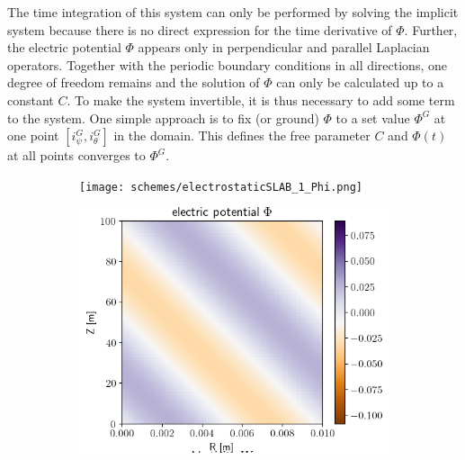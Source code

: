 The time integration of this system can only be performed by solving the implicit system because there is no direct expression for the time derivative of $\Phi$. Further, the electric potential $\Phi$ appears only in perpendicular and parallel Laplacian operators. Together with the periodic boundary conditions in all directions, one degree of freedom remains and the solution of $\Phi$ can only be calculated up to a constant $C$. To make the system invertible, it is thus necessary to add some term to the system. One simple approach is to fix (or ground) $\Phi$ to a set value $\Phi^G$ at one point $[i_\psi^G, i_\theta^G]$ in the domain. This defines the free parameter $C$ and $\Phi(t)$ at all points converges to $\Phi^G$. 

\begin{figure}[H]
	\centering
	\begin{subfigure}[b]{0.34\textwidth}
		\centering
		\texttt{[image: schemes/electrostaticSLAB\_1\_Phi.png]}
		\label{fig:electrostaticSLAB_initialProfile_PHI}
	\end{subfigure}
	\begin{subfigure}[b]{0.34\textwidth}
		\centering
		\includegraphics[width=1.\textwidth]{schemes/electrostaticSLAB_35_Phi.png}
		\label{fig:electrostaticSLAB_endProfile_PHI}
	\end{subfigure}
	\begin{subfigure}[b]{0.30\textwidth}

\end{subfigure}
\end{figure}
